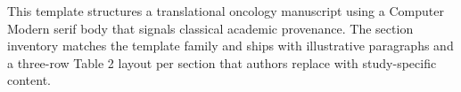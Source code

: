 
This template structures a translational oncology manuscript using a Computer Modern serif body that signals classical academic provenance. The section inventory matches the template family and ships with illustrative paragraphs and a three-row Table 2 layout per section that authors replace with study-specific content.
